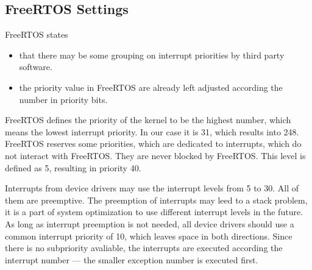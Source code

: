 \subsection{FreeRTOS Settings}
FreeRTOS states
\begin{itemize}
\item  that there may be some grouping on interrupt priorities 
by third party software. 
\item the priority value in FreeRTOS are already left adjusted according the
number in priority bits. 
\end{itemize}
FreeRTOS defines the priority of the kernel to be the highest number, which
means the lowest interrupt priority. In our case it is 31, which results into
248. 
FreeRTOS reserves some priorities, which are dedicated to interrupts, which do not interact with FreeRTOS. They are never blocked by FreeRTOS.
This level is defined as 5, resulting in priority 40.

Interrupts from device drivers may use the interrupt levels from 5 to 30.
All of them are preemptive. 
The preemption of interrupts may leed to a stack problem, it is a part of
system optimization to use different interrupt levels in the future.
As long as interrupt preemption is not needed, all device drivers should use 
a common interrupt priority of 10, which leaves space in both directions.
Since there is no subpriority avaliable, the 
interrupts are executed according the interrupt number --- 
the smaller exception number is executed first.


